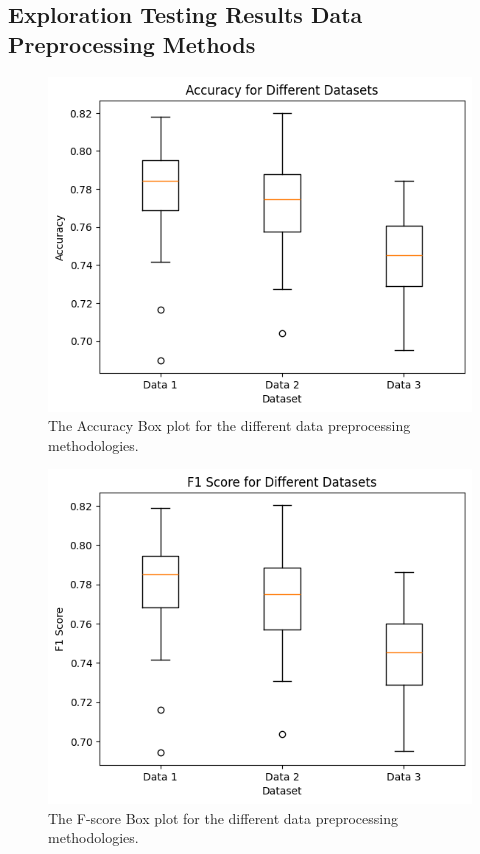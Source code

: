 \documentclass[conference]{IEEEtran}
\begin{document}
\subsection{Exploration Testing Results Data Preprocessing Methods}

\begin{figure}[htbp]
\centerline{\includegraphics[width=0.9\columnwidth]{Ex Per Data Pre Pros Box Acc.png}}
\caption{The Accuracy Box plot for the different data preprocessing methodologies.}
\label{fig:Ex Per Data Pre Pros Box Acc}
\end{figure}

\FloatBarrier

\begin{figure}[htbp]
\centerline{\includegraphics[width=0.9\columnwidth]{Ex Per Data Pre Pros Box F1.png}}
\caption{The F-score Box plot for the different data preprocessing methodologies.}
\label{fig:Ex Per Data Pre Pros Box F1}
\end{figure}
\end{document}
